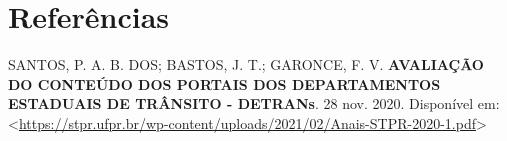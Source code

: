 \documentclass[
  a4paper,
]{article}
\newlength{\cslhangindent}
\newenvironment{CSLReferences}[2] %
 {\begin{list}{}{%
  \setlength{\itemindent}{0pt}
  \setlength{\leftmargin}{0pt}
  \setlength{\parsep}{0pt}
  \ifodd #1
   \setlength{\leftmargin}{\cslhangindent}
   \setlength{\itemindent}{-1\cslhangindent}
  \fi
  \setlength{\itemsep}{#2\baselineskip}}}
 {\end{list}}
\begin{document}
\section*{Referências}\label{referuxeancias}

\label{refs}
\begin{CSLReferences}{0}{1}
SANTOS, P. A. B. DOS; BASTOS, J. T.; GARONCE, F. V. \textbf{AVALIAÇÃO DO
CONTEÚDO DOS PORTAIS DOS DEPARTAMENTOS ESTADUAIS DE TRÂNSITO - DETRANs}.
28 nov. 2020. Disponível em:
\textless{}\url{https://stpr.ufpr.br/wp-content/uploads/2021/02/Anais-STPR-2020-1.pdf}\textgreater{}

\end{CSLReferences}
\end{document}
